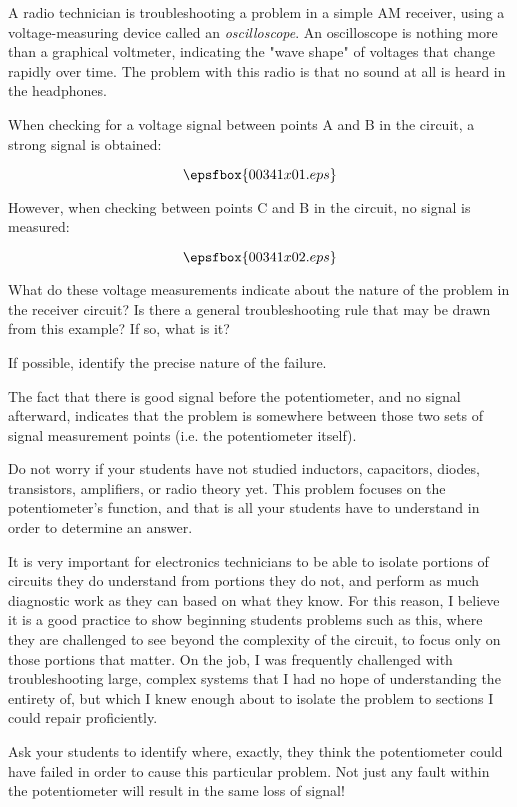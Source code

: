 

A radio technician is troubleshooting a problem in a simple AM receiver, using a voltage-measuring device called an {\it oscilloscope}.  An oscilloscope is nothing more than a graphical voltmeter, indicating the "wave shape" of voltages that change rapidly over time.  The problem with this radio is that no sound at all is heard in the headphones.

When checking for a voltage signal between points A and B in the circuit, a strong signal is obtained:

$$\epsfbox{00341x01.eps}$$

However, when checking between points C and B in the circuit, no signal is measured:

$$\epsfbox{00341x02.eps}$$

What do these voltage measurements indicate about the nature of the problem in the receiver circuit?  Is there a general troubleshooting rule that may be drawn from this example?  If so, what is it?

If possible, identify the precise nature of the failure.







The fact that there is good signal before the potentiometer, and no signal afterward, indicates that the problem is somewhere between those two sets of signal measurement points (i.e. the potentiometer itself).







Do not worry if your students have not studied inductors, capacitors, diodes, transistors, amplifiers, or radio theory yet.  This problem focuses on the potentiometer's function, and that is all your students have to understand in order to determine an answer.  

It is very important for electronics technicians to be able to isolate portions of circuits they do understand from portions they do not, and perform as much diagnostic work as they can based on what they know.  For this reason, I believe it is a good practice to show beginning students problems such as this, where they are challenged to see beyond the complexity of the circuit, to focus only on those portions that matter.  On the job, I was frequently challenged with troubleshooting large, complex systems that I had no hope of understanding the entirety of, but which I knew enough about to isolate the problem to sections I could repair proficiently.

Ask your students to identify where, exactly, they think the potentiometer could have failed in order to cause this particular problem.  Not just any fault within the potentiometer will result in the same loss of signal!




